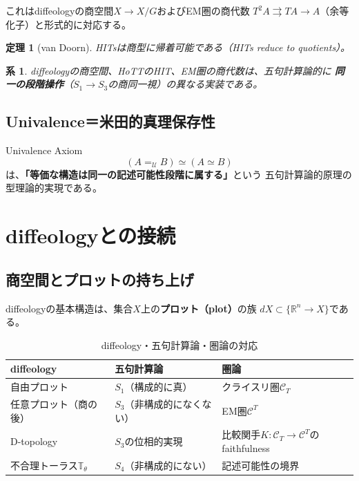 \documentclass[11pt,a4paper]{ltjsarticle}
\newtheorem{theorem}[definition]{定理}
\newtheorem{corollary}[definition]{系}
\theoremstyle{remark}
\begin{document}
これはdiffeologyの商空間$X\to X/G$およびEM圏の商代数
$T^2A\rightrightarrows TA\to A$（余等化子）と形式的に対応する。

\begin{theorem}[van Doorn]
HITsは商型に帰着可能である（HITs reduce to quotients）\cite{vanDoorn2016}。
\end{theorem}

\begin{corollary}
diffeologyの商空間、HoTTのHIT、EM圏の商代数は、五句計算論的に
\textbf{同一の段階操作}（$S_1\to S_3$の商同一視）の異なる実装である。
\end{corollary}

\subsection{Univalence＝米田的真理保存性}

Univalence Axiom
\[
 (A=_{\mathcal{U}}B)\simeq(A\simeq B)
\]
は、\textbf{「等価な構造は同一の記述可能性段階に属する」}という
五句計算論的原理の型理論的実現である\cite{HoTTBook2013}。

\section{diffeologyとの接続}

\subsection{商空間とプロットの持ち上げ}

diffeologyの基本構造は、集合$X$上の\textbf{プロット（plot）}の族
$dX\subset\{\mathbb{R}^n\to X\}$である\cite{IglesiasZemmour}。

\begin{table}[htbp]
\centering
\caption{diffeology・五句計算論・圏論の対応}
\label{tab:diffeology}
\small
\begin{tabularx}{\textwidth}{@{}>{\raggedright\arraybackslash}X >{\raggedright\arraybackslash}X >{\raggedright\arraybackslash}X@{}}
\toprule
diffeology & 五句計算論 & 圏論 \\
\midrule
自由プロット & $S_1$（構成的に真） & クライスリ圏$\mathcal{C}_T$ \\
任意プロット（商の後） & $S_3$（非構成的になくない） & EM圏$\mathcal{C}^T$ \\
D-topology & $S_3$の位相的実現 & 比較関手$K:\mathcal{C}_T\to\mathcal{C}^T$のfaithfulness \\
不合理トーラス$\mathbb{T}_\theta$ & $S_4$（非構成的にない） & 記述可能性の境界 \\
\bottomrule
\end{tabularx}
\end{table}
\end{document}
